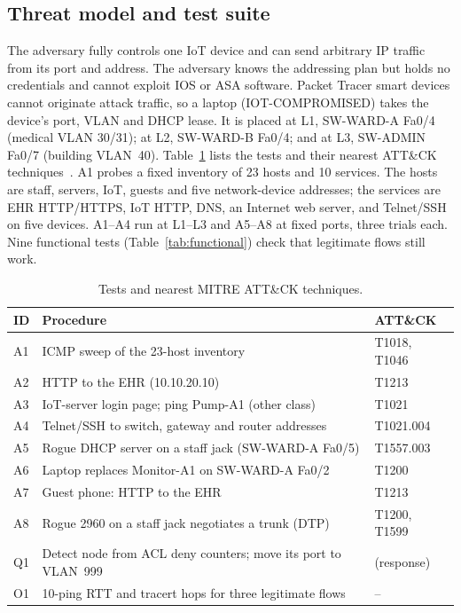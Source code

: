 \subsection{Threat model and test suite}
The adversary fully controls one IoT device and can send arbitrary IP traffic from its port and address. The adversary knows the addressing plan but holds no credentials and cannot exploit IOS or ASA software. Packet Tracer smart devices cannot originate attack traffic, so a laptop (IOT-COMPROMISED) takes the device's port, VLAN and DHCP lease. It is placed at L1, SW-WARD-A Fa0/4 (medical VLAN 30/31); at L2, SW-WARD-B Fa0/4; and at L3, SW-ADMIN Fa0/7 (building VLAN~40). Table~\ref{tab:attackdef} lists the tests and their nearest ATT\&CK techniques~\cite{mitreattack}. A1 probes a fixed inventory of 23 hosts and 10 services. The hosts are staff, servers, IoT, guests and five network-device addresses; the services are EHR HTTP/HTTPS, IoT HTTP, DNS, an Internet web server, and Telnet/SSH on five devices. A1--A4 run at L1--L3 and A5--A8 at fixed ports, three trials each. Nine functional tests (Table~\ref{tab:functional}) check that legitimate flows still work.

\begin{table}[t]
\centering
\caption{Tests and nearest MITRE ATT\&CK techniques.}
\label{tab:attackdef}
\scriptsize
\setlength{\tabcolsep}{2.5pt}
\begin{tabular}{@{}lp{}p{}@{}}
\toprule
ID & Procedure & ATT\&CK \\
\midrule
A1 & ICMP sweep of the 23-host inventory & T1018, T1046 \\
A2 & HTTP to the EHR (10.10.20.10) & T1213 \\
A3 & IoT-server login page; ping Pump-A1 (other class) & T1021 \\
A4 & Telnet/SSH to switch, gateway and router addresses & T1021.004 \\
A5 & Rogue DHCP server on a staff jack (SW-WARD-A Fa0/5) & T1557.003 \\
A6 & Laptop replaces Monitor-A1 on SW-WARD-A Fa0/2 & T1200 \\
A7 & Guest phone: HTTP to the EHR & T1213 \\
A8 & Rogue 2960 on a staff jack negotiates a trunk (DTP) & T1200, T1599 \\
Q1 & Detect node from ACL deny counters; move its port to VLAN~999 & (response) \\
O1 & 10-ping RTT and tracert hops for three legitimate flows & -- \\
\bottomrule
\end{tabular}
\end{table}

